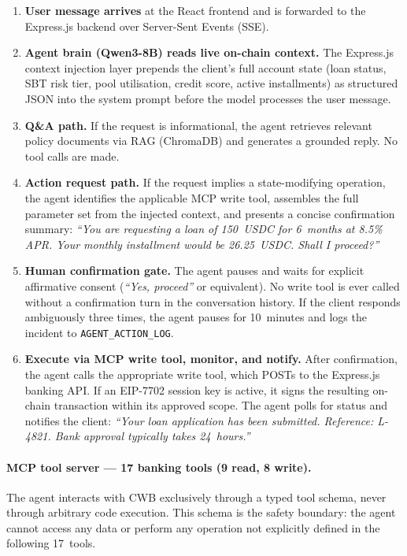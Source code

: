 \documentclass[12pt, a4paper]{report}
\begin{document}
\begin{enumerate}[noitemsep]
\item \textbf{User message arrives} at the React frontend and is forwarded to the Express.js backend over Server-Sent Events (SSE).
\item \textbf{Agent brain (Qwen3-8B) reads live on-chain context.} The Express.js context injection layer prepends the client's full account state (loan status, SBT risk tier, pool utilisation, credit score, active installments) as structured JSON into the system prompt before the model processes the user message.
\item \textbf{Q\&A path.} If the request is informational, the agent retrieves relevant policy documents via RAG (ChromaDB) and generates a grounded reply. No tool calls are made.
\item \textbf{Action request path.} If the request implies a state-modifying operation, the agent identifies the applicable MCP write tool, assembles the full parameter set from the injected context, and presents a concise confirmation summary: \emph{``You are requesting a loan of 150~USDC for 6~months at 8.5\% APR. Your monthly installment would be 26.25~USDC. Shall I proceed?''}
\item \textbf{Human confirmation gate.} The agent pauses and waits for explicit affirmative consent (\emph{``Yes, proceed''} or equivalent). No write tool is ever called without a confirmation turn in the conversation history. If the client responds ambiguously three times, the agent pauses for 10~minutes and logs the incident to \texttt{AGENT\_ACTION\_LOG}.
\item \textbf{Execute via MCP write tool, monitor, and notify.} After confirmation, the agent calls the appropriate write tool, which POSTs to the Express.js banking API. If an EIP-7702 session key is active, it signs the resulting on-chain transaction within its approved scope. The agent polls for status and notifies the client: \emph{``Your loan application has been submitted. Reference: L-4821. Bank approval typically takes 24~hours.''}
\end{enumerate}

\paragraph{MCP tool server --- 17 banking tools (9 read, 8 write).}

The agent interacts with CWB exclusively through a typed tool schema, never through arbitrary code execution. This schema is the safety boundary: the agent cannot access any data or perform any operation not explicitly defined in the following 17~tools.
\end{document}
